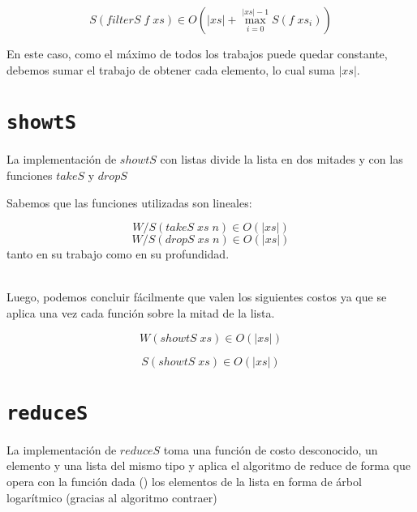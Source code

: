 \documentclass[a4paper,10pt]{article}
\begin{document}
\begin{equation*}
    S \left(filterS\; f \; xs \right) \in
    O \left( \vert xs \vert + \max_{i=0}^{\vert xs \vert -1} S \left( f\; xs_i \right) \right)
\end{equation*}

En este caso, como el máximo de todos los trabajos puede quedar constante, debemos
sumar el trabajo de obtener cada elemento, lo cual suma $\vert xs \vert$.


\bigskip

 
\section*{\texttt{showtS}}

    La implementación de $showtS$ con listas divide la lista en dos mitades
y con las funciones $takeS$ y $dropS$

    Sabemos que las funciones utilizadas son lineales:

\begin{equation*}
    W/S \left( takeS\; xs\; n \right) \in 
    O \left( \vert xs \vert \right)
\end{equation*}
\begin{equation*}
    W/S \left( dropS\; xs\; n \right) \in 
    O \left( \vert xs \vert \right)
\end{equation*}
tanto en su trabajo como en su profundidad. 

\bigskip
\\   
    Luego, podemos concluir fácilmente que valen los siguientes costos ya
que se aplica una vez cada función sobre la mitad de la lista.

\begin{equation*}
    W \left( showtS\; xs \right) \in O \left( \vert xs \vert \right)
\end{equation*}

\begin{equation*}
    S \left( showtS\; xs \right) \in O \left( \vert xs \vert \right)
\end{equation*}


\bigskip
    

\section*{\texttt{reduceS}}

    La implementación de $reduceS$ toma una función de costo desconocido,
un elemento y una lista del mismo tipo y aplica el algoritmo de reduce
de forma que opera con la función dada (\oplus) los elementos de la lista
en forma de árbol logarítmico (gracias al algoritmo contraer)
\end{document}
